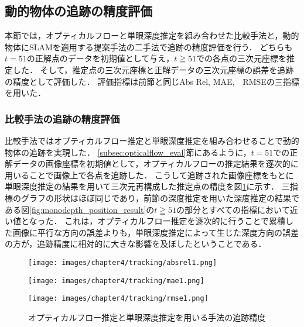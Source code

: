 \subsection{動的物体の追跡の精度評価}\label{subsec:tracking_eval}
本節では，オプティカルフローと単眼深度推定を組み合わせた比較手法と，動的物体にSLAMを適用する提案手法の二手法で追跡の精度評価を行う．
どちらも$t=51$の正解点のデータを初期値として与え，$t\geqq51$での各点の三次元座標を推定した．
そして，推定点の三次元座標と正解データの三次元座標の誤差を追跡の精度として評価した．
評価指標は前節と同じAbs Rel, MAE,　RMSEの三指標を用いた．

\subsubsection{比較手法の追跡の精度評価}\label{subsubsec:2d_tracking_eval}
比較手法ではオプティカルフロー推定と単眼深度推定を組み合わせることで動的物体の追跡を実現した．
\ref{subsec:opticalflow_eval}節にあるように，$t=51$での正解データの画像座標を初期値として，オプティカルフローの推定結果を逐次的に用いることで画像上で各点を追跡した．
こうして追跡された画像座標をもとに単眼深度推定の結果を用いて三次元再構成した推定点の精度を図\ref{fig:monodepth_tracking_result}に示す．
三指標のグラフの形状はほぼ同じであり，前節の深度推定を用いた深度推定の結果である図\ref{fig:monodepth_position_result}の$t\geqq51$の部分とすべての指標において近い値となった．
これは，オプティカルフロー推定を逐次的に行うことで累積した画像に平行な方向の誤差よりも，単眼深度推定によって生じた深度方向の誤差の方が，追跡精度に相対的に大きな影響を及ぼしたということである．

\begin{figure}[H]
	\centering
	\begin{minipage}[t]{0.45\linewidth}
		\centering
		\texttt{[image: images/chapter4/tracking/absrel1.png]}
		\label{fig:tracking_absrel1}
	\end{minipage}
	\begin{minipage}[t]{0.45\linewidth}
		\centering
		\texttt{[image: images/chapter4/tracking/mae1.png]}
		\label{fig:tracking_mae1}
	\end{minipage}
	\begin{minipage}[t]{0.45\linewidth}
		\centering
		\texttt{[image: images/chapter4/tracking/rmse1.png]}
		\label{fig:tracking_rmse1}
	\end{minipage}
	\caption{オプティカルフロー推定と単眼深度推定を用いる手法の追跡精度}
	\label{fig:monodepth_tracking_result}
\end{figure}

